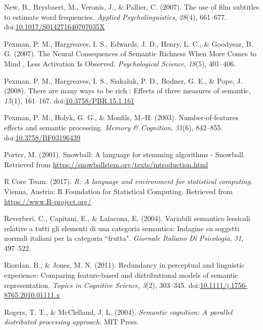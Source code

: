 \documentclass[english,,man]{apa6}
\theoremstyle{definition}
\theoremstyle{definition}
\theoremstyle{definition}
\theoremstyle{remark}
\begin{document}
\hypertarget{ref-New2007}{}
New, B., Brysbaert, M., Veronis, J., \& Pallier, C. (2007). The use of
film subtitles to estimate word frequencies. \emph{Applied
Psycholinguistics}, \emph{28}(4), 661--677.
doi:\href{https://doi.org/10.1017/S014271640707035X}{10.1017/S014271640707035X}

\hypertarget{ref-Pexman2007}{}
Pexman, P. M., Hargreaves, I. S., Edwards, J. D., Henry, L. C., \&
Goodyear, B. G. (2007). The Neural Consequences of Semantic Richness
When More Comes to Mind , Less Activation Is Observed.
\emph{Psychological Science}, \emph{18}(5), 401--406.

\hypertarget{ref-Pexman2008}{}
Pexman, P. M., Hargreaves, I. S., Siakaluk, P. D., Bodner, G. E., \&
Pope, J. (2008). There are many ways to be rich : Effects of three
measures of semantic, \emph{15}(1), 161--167.
doi:\href{https://doi.org/10.3758/PBR.15.1.161}{10.3758/PBR.15.1.161}

\hypertarget{ref-Pexman2003}{}
Pexman, P. M., Holyk, G. G., \& Monfils, M.-H. (2003).
Number-of-features effects and semantic processing. \emph{Memory \&
Cognition}, \emph{31}(6), 842--855.
doi:\href{https://doi.org/10.3758/BF03196439}{10.3758/BF03196439}

\hypertarget{ref-Porter2001}{}
Porter, M. (2001). Snowball: A language for stemming algorithms -
Snowball. Retrieved from
\url{https://snowballstem.org/texts/introduction.html}

\hypertarget{ref-R-base}{}
R Core Team. (2017). \emph{R: A language and environment for statistical
computing}. Vienna, Austria: R Foundation for Statistical Computing.
Retrieved from \url{https://www.R-project.org/}

\hypertarget{ref-Reverberi2004}{}
Reverberi, C., Capitani, E., \& Laiacona, E. (2004). Variabili semantico
lessicali relative a tutti gli elementi di una categoria semantica:
Indagine su soggetti normali italiani per la categoria ``frutta".
\emph{Giornale Italiano Di Psicologia}, \emph{31}, 497--522.

\hypertarget{ref-Riordan2011}{}
Riordan, B., \& Jones, M. N. (2011). Redundancy in perceptual and
linguistic experience: Comparing feature-based and distributional models
of semantic representation. \emph{Topics in Cognitive Science},
\emph{3}(2), 303--345.
doi:\href{https://doi.org/10.1111/j.1756-8765.2010.01111.x}{10.1111/j.1756-8765.2010.01111.x}

\hypertarget{ref-Rogers2004}{}
Rogers, T. T., \& McClelland, J. L. (2004). \emph{Semantic cognition: A
parallel distributed processing approach}. MIT Press.
\end{document}
